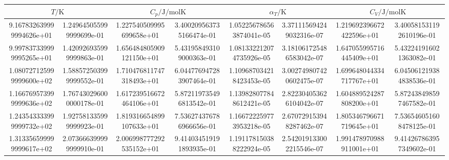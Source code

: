 \begin{table}
  \centering
  \begin{tabular}{  
|S[round-mode = places , round-precision = 1,scientific-notation=fixed, fixed-exponent = 0]
@{${}\pm \quad$} 
S[round-mode = places , round-precision = 1,scientific-notation=fixed, fixed-exponent = 0]
|S[round-mode = places , round-precision = 0,scientific-notation=fixed, fixed-exponent = 0]
@{${}\pm{}$} 
S[round-mode = places , round-precision = 0] 
|S[round-mode = places , round-precision = 1,scientific-notation=fixed, fixed-exponent = -6 ] 
@{$\quad\pm{}$}
S[round-mode = places , round-precision = 0]
|S[round-mode = places , round-precision = 0,scientific-notation=fixed, fixed-exponent = 0]
@{${}\pm{}$} 
S[round-mode = places , round-precision = 0] |
}
    \toprule
      & 
    & 
     & 
    \\
    \midrule
9.167832639999994626e+01 & 1.249645055999999699e-01 & 1.227540509995699658e+01 & 3.400209563735166474e-01 & 1.052256786563874041e-05 & 3.371115694249032316e-07 & 1.219692396672422596e+01 & 3.400581531192610196e-01\\
9.997837339999995265e+01 & 1.420926935999999863e-01 & 1.656484805909121150e+01 & 5.431958493109000363e-01 & 1.081332212074735926e-05 & 3.181061725486583042e-07 & 1.647055995716445409e+01 & 5.432241916021363082e-01\\
1.080727125999999600e+02 & 1.588572503999999552e-01 & 1.710476811747318493e+01 & 6.044776947283907464e-01 & 1.109687034218423453e-05 & 3.002749807420602475e-07 & 1.699648044334717767e+01 & 6.045061219384838536e-01\\
1.166769573999999636e+02 & 1.767430296000000178e-01 & 1.617239516672464106e+01 & 5.872119735496813542e-01 & 1.139828077848612421e-05 & 2.822304053626104042e-07 & 1.604889524287808200e+01 & 5.872438498597467582e-01\\
1.243543333999999732e+02 & 1.927581335999999923e-01 & 1.819316654899107633e+01 & 7.536274376786966656e-01 & 1.166722259773953218e-05 & 2.670729153948287462e-07 & 1.805346796671719645e+01 & 7.536546051608478125e-01\\
1.313356599999999617e+02 & 2.073666399999999910e-01 & 2.006998777292535152e+01 & 9.414034519191893935e-01 & 1.191178150388222924e-05 & 2.542019133002215546e-07 & 1.991478970988911001e+01 & 9.414267863957349602e-01\\

\end{tabular}
\end{table}
